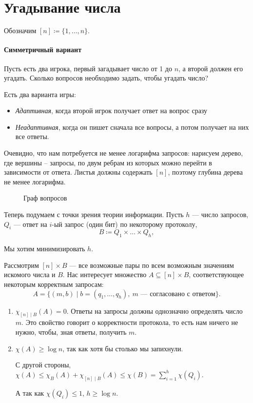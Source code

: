 \section{Угадывание числа}
Обозначим $ [n] \coloneqq \{1, \ldots , n\}$.
\paragraph{Симметричный вариант}
Пусть есть два игрока, первый загадывает число от 1 до $ n$, а второй должен его угадать. Сколько вопросов необходимо задать, чтобы угадать число?

Есть два варианта игры:
\begin{itemize}
	\item \textit{Адаптивная}, когда второй игрок получает ответ на вопрос сразу
	\item \textit{Неадаптивная}, когда он пишет сначала все вопросы, а потом получает на них все ответы.
\end{itemize}
Очевидно, что нам потребуется не менее логарифма запросов: нарисуем дерево, где вершины -- запросы, по двум ребрам из которых  можно перейти в зависимости от ответа. Листья должны содержать $ [n]$, поэтому глубина дерева не менее логарифма.
\begin{figure}[ht]
    \centering
    \label{fig:graph-img}
	\caption{Граф вопросов}
\end{figure}

Теперь подумаем с точки зрения теории информации.
Пусть $ h$ --- число запросов, $ Q_i$ --- ответ на $ i$-ый запрос (один бит) по некоторому протоколу, 
$$ B \coloneqq Q_1 \times \ldots \times Q_h,$$ 

Мы хотим минимизировать $ h$.

Рассмотрим $ [n]\times B$ --- все возможные пары по всем возможным значениям искомого числа и $ B$. 
Нас интересует множество  $ A \subseteq [n]\times B$, соответствующее некоторым корректным запросам:
\[
	A = \{(m, b) \mid b = (q_1, \ldots , q_h), ~ m \text{ --- согласовано с ответом}\}
.\] 

\begin{enumerate}
	\item $ \chi _{[n] \mid B}(A) = 0$. Ответы на запросы должны однозначно определять число $ m$. Это свойство говорит о корректности протокола, то есть нам ничего не нужно, чтобы, зная ответы, получить $ m$.
	\item $ \chi(A) \ge \log n$, так как хотя бы столько мы запихнули. 

		С другой стороны, $ \chi(A) \le \chi_{B}(A) + \chi_{[n] \mid B}(A) \le \chi(B) = \sum_{i=1}^{h} \chi(Q_i)$. 

		А так как $ \chi(Q_i) \le 1$, $  h \ge \log n $.
\end{enumerate} 

